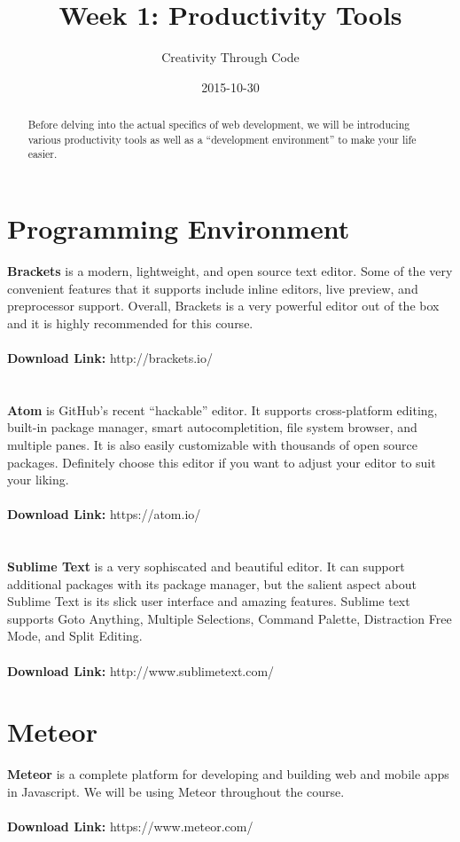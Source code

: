\documentclass[11pt, letterpaper]{article}
\title{Week 1: Productivity Tools}
\date{2015-10-30}
\author{Creativity Through Code}
\begin{document}
	\maketitle
	\newpage
	\begin{abstract}
		Before delving into the actual specifics of web development, we will be introducing various productivity tools as well as a “development environment” to make your life easier.
	\end{abstract}
	\section{Programming Environment}
		\textbf{Brackets} is a modern, lightweight, and open source text editor. Some of the very convenient features that it supports include inline editors, live preview, and preprocessor support. Overall, Brackets is a very powerful editor out of the box and it is highly recommended for this course.
		\\\\
		\textbf{Download Link:} http://brackets.io/
		\\\\\\
		\textbf{Atom} is GitHub's recent ``hackable'' editor. It supports cross-platform editing, built-in package manager, smart autocompletition, file system browser, and multiple panes. It is also easily customizable with thousands of open source packages. Definitely choose this editor if you want to adjust your editor to suit your liking.
		\\\\
		\textbf{Download Link:} https://atom.io/
		\\\\\\
		\textbf{Sublime Text} is a very sophiscated and beautiful editor. It can support additional packages with its package manager, but the salient aspect about Sublime Text is its slick user interface and amazing features. Sublime text supports Goto Anything, Multiple Selections, Command Palette, Distraction Free Mode, and Split Editing.
		\\\\
		\textbf{Download Link:} http://www.sublimetext.com/ 
	\section{Meteor}
		\textbf{Meteor} is a complete platform for developing and building web and mobile apps in Javascript. We will be using Meteor throughout the course.
		\\\\
		\textbf{Download Link:} https://www.meteor.com/
\end{document}
